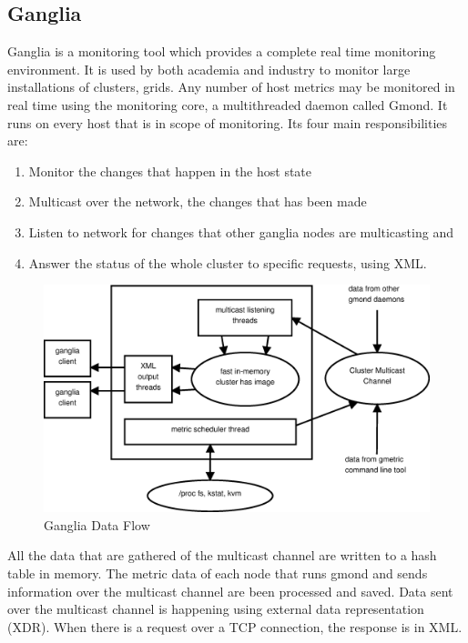 \subsection{Ganglia}

Ganglia is a monitoring tool which provides a complete real time monitoring environment. It is used by both academia and industry to monitor large installations of clusters, grids. Any number of host metrics may be monitored in real time using the monitoring core, a multithreaded daemon called Gmond. It runs on every host that is in scope of monitoring. Its four main responsibilities are:

\begin{enumerate}
\item Monitor the changes that happen in the host state
\item Multicast over the network, the changes that has been made
\item Listen to network for changes that other ganglia nodes are multicasting and
\item Answer the status of the whole cluster to specific requests, using XML.
\end{enumerate}

\begin{figure}[ht]
\centering
 \includegraphics[width=130mm]{images/ganglia.eps}
\caption{Ganglia Data Flow}
\label{figure:ganglia}
\end{figure}

All the data that are gathered of the multicast channel are written to a hash table in memory. The metric data of each node that runs gmond and sends information over the multicast channel are been processed and saved. Data sent over the multicast channel is happening using external data representation (XDR). When there is a request over a TCP connection, the response is in XML.

